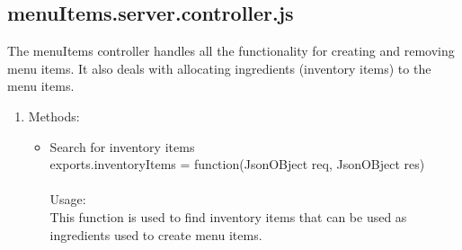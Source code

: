 \documentclass[a4paper,12pt]{article}
\begin{document}
\subsection{menuItems.server.controller.js}
 The menuItems controller handles all the functionality for creating and removing menu items. It also deals with allocating ingredients (inventory items) to the menu items.
\begin{enumerate}
\item Methods:
	\begin{itemize}
	\item Search for inventory items\\ exports.inventoryItems = function(JsonOBject req, JsonOBject res)\\ \\
  	Usage: \\
  	This function is used to find inventory items that can be used as ingredients used to create menu items.
	

\end{itemize}
\end{enumerate}
\end{document}
